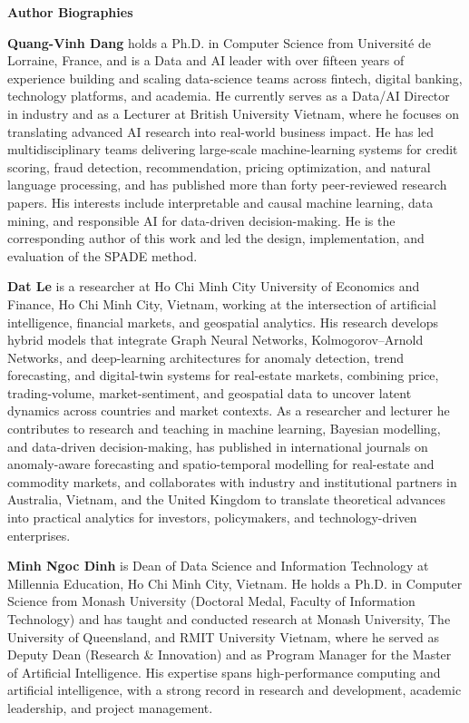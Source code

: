 \documentclass[11pt]{article}
\begin{document}
\begin{center}\Large\textbf{Author Biographies}\end{center}
\vspace{1em}

\textbf{Quang-Vinh Dang} holds a Ph.D. in Computer Science from Universit\'e de
Lorraine, France, and is a Data and AI leader with over fifteen years of
experience building and scaling data-science teams across fintech, digital
banking, technology platforms, and academia. He currently serves as a Data/AI
Director in industry and as a Lecturer at British University Vietnam, where he
focuses on translating advanced AI research into real-world business impact. He
has led multidisciplinary teams delivering large-scale machine-learning systems
for credit scoring, fraud detection, recommendation, pricing optimization, and
natural language processing, and has published more than forty peer-reviewed
research papers. His interests include interpretable and causal machine learning,
data mining, and responsible AI for data-driven decision-making. He is the
corresponding author of this work and led the design, implementation, and
evaluation of the SPADE method.

\textbf{Dat Le} is a researcher at Ho Chi Minh City University of Economics and
Finance, Ho Chi Minh City, Vietnam, working at the intersection of artificial
intelligence, financial markets, and geospatial analytics. His research develops
hybrid models that integrate Graph Neural Networks, Kolmogorov--Arnold Networks,
and deep-learning architectures for anomaly detection, trend forecasting, and
digital-twin systems for real-estate markets, combining price, trading-volume,
market-sentiment, and geospatial data to uncover latent dynamics across countries
and market contexts. As a researcher and lecturer he contributes to research and
teaching in machine learning, Bayesian modelling, and data-driven
decision-making, has published in international journals on anomaly-aware
forecasting and spatio-temporal modelling for real-estate and commodity markets,
and collaborates with industry and institutional partners in Australia, Vietnam,
and the United Kingdom to translate theoretical advances into practical analytics
for investors, policymakers, and technology-driven enterprises.

\textbf{Minh Ngoc Dinh} is Dean of Data Science and Information Technology at
Millennia Education, Ho Chi Minh City, Vietnam. He holds a Ph.D. in Computer
Science from Monash University (Doctoral Medal, Faculty of Information Technology)
and has taught and conducted research at Monash University, The University of
Queensland, and RMIT University Vietnam, where he served as Deputy Dean (Research
\& Innovation) and as Program Manager for the Master of Artificial Intelligence.
His expertise spans high-performance computing and artificial intelligence, with a
strong record in research and development, academic leadership, and project
management.
\end{document}

